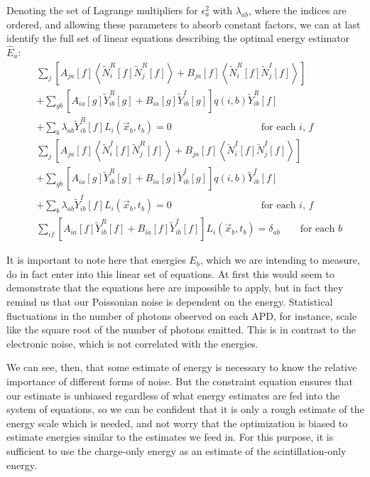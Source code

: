 Denoting the set of Lagrange multipliers for $\epsilon^2_a$ with $\lambda_{ab}$, where the indices are ordered, and allowing these parameters to absorb constant factors, we can at last identify the full set of linear equations describing the optimal energy estimator $\widehat{E}_a$:
\begin{subequations}\label{eqn:SystemToSolve}\begin{align}
&\sum_j \left[ A_{ja}[f] \left<\widetilde{N}_i^R[f]\widetilde{N}_j^R[f]\right> + B_{ja}[f] \left<\widetilde{N}_i^R[f]\widetilde{N}_j^I[f]\right>\right]\nonumber\\
&+ \sum_{gb} \left[A_{ia}[g] \widetilde{Y}_{ib}^R[g] + B_{ia}[g] \widetilde{Y}_{ib}^I[g]\right] q(i,b) \widetilde{Y}_{ib}^R[f] \nonumber\\
&+ \sum_b \lambda_{ab} \widetilde{Y}^R_{ib}[f] L_i(\vec{x}_b,t_b) = 0 \qquad \qquad \qquad \qquad \quad \text{for each $i$, $f$}\\
%
&\sum_j \left[ A_{ja}[f] \left<\widetilde{N}_i^I[f]\widetilde{N}_j^R[f]\right> + B_{ja}[f] \left<\widetilde{N}_i^I[f]\widetilde{N}_j^I[f]\right>\right]\nonumber\\
&+ \sum_{gb} \left[A_{ia}[g] \widetilde{Y}_{ib}^R[g] + B_{ia}[g] \widetilde{Y}_{ib}^I[g]\right] q(i,b) \widetilde{Y}_{ib}^I[f] \nonumber\\
&+ \sum_b \lambda_{ab} \widetilde{Y}^I_{ib}[f] L_i(\vec{x}_b,t_b) = 0 \qquad \qquad \qquad \qquad \quad \text{for each $i$, $f$}\\
%
&\sum_{if}\left[A_{ia}[f] \widetilde{Y}_{ib}^R[f] + B_{ia}[f] \widetilde{Y}_{ib}^I[f]\right] L_i(\vec{x}_b,t_b) = \delta_{ab} \qquad \text{for each $b$}
\end{align}\end{subequations}

It is important to note here that energies $E_b$, which we are intending to measure, do in fact enter into this linear set of equations.  At first this would seem to demonstrate that the equations here are impossible to apply, but in fact they remind us that our Poissonian noise is dependent on the energy.  Statistical fluctuations in the number of photons observed on each APD, for instance, scale like the square root of the number of photons emitted.  This is in contrast to the electronic noise, which is not correlated with the energies.

We can see, then, that some estimate of energy is necessary to know the relative importance of different forms of noise.  But the constraint equation ensures that our estimate is unbiased regardless of what energy estimates are fed into the system of equations, so we can be confident that it is only a rough estimate of the energy scale which is needed, and not worry that the optimization is biased to estimate energies similar to the estimates we feed in.  For this purpose, it is sufficient to use the charge-only energy as an estimate of the scintillation-only energy.

